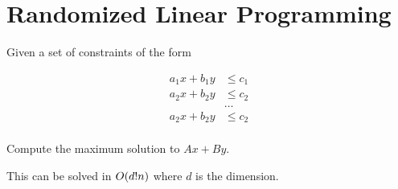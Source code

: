 \chapter{Randomized Linear Programming}

Given a set of constraints of the form

\begin{align*}
  a_1 x + b_1 y &\le c_1 \\
  a_2 x + b_2 y &\le c_2 \\
  &\ldots \\
  a_2 x + b_2 y &\le c_2 \\
\end{align*}

Compute the maximum solution to $A x + B y$.

This can be solved in $O\!\left(d!n\right)$ where $d$ is the dimension.
